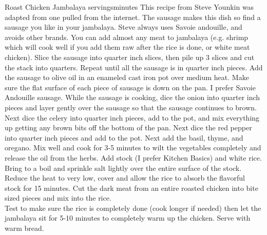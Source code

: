 \begin{recipe}{Roast Chicken Jambalaya}
{\unit[6]{servings}}{\unit[45]{minutes}}
\freeform This recipe from Steve Younkin was adapted from one pulled
from the internet. The sausage makes this dish so find a sausage you
like in your jambalaya. Steve always uses Savoie andouille, and avoids
other brands. You can add almost any meat to jambalaya (e.g. shrimp
which will cook well if you add them raw after the rice is done, or
white meat chicken).
Slice the sausage into quarter inch slices, then pile up 3 slices and
cut the stack into quarters. Repeat until all the sausage is in
quarter inch pieces. Add the sausage to olive oil in an enameled cast
iron pot over medium heat. Make sure the flat surface of each piece of
sausage is down on the pan. I prefer Savoie Andouille sausage.
While the sausage is cooking, dice the onion into quarter inch pieces
and layer gently over the sausage so that the sausage continues to
brown.
Next dice the celery into quarter inch pieces, add to the pot, and mix
everything up getting any brown bits off the bottom of the pan.
Next dice the red pepper into quarter inch pieces and add to the pot.
Next add the basil, thyme, and oregano. Mix well and cook for 3-5
minutes to wilt the vegetables completely and release the oil from the
herbs.
Add stock (I prefer Kitchen Basics) and white rice. Bring to a boil
and sprinkle salt lightly over the entire surface of the stock. Reduce
the heat to very low, cover and allow the rice to absorb the flavorful
stock for 15 minutes.
Cut the dark meat from an entire roasted chicken into bite
sized pieces and mix into the rice.\\
\freeform Test to make sure the rice is completely done (cook longer if
needed) then let the jambalaya sit for 5-10 minutes to completely warm
up the chicken. Serve with warm bread.
\end{recipe}
